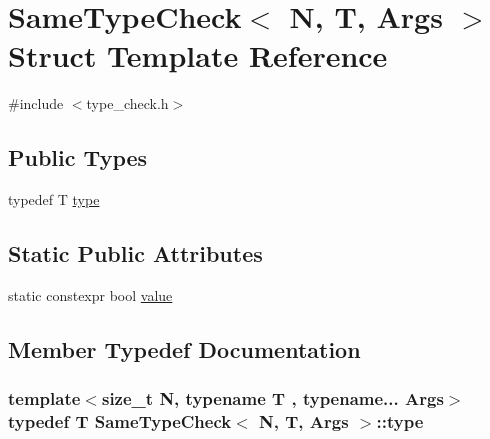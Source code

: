 \hypertarget{struct_same_type_check}{\section{Same\-Type\-Check$<$ N, T, Args $>$ Struct Template Reference}
\label{struct_same_type_check}
}


{\ttfamily \#include $<$type\-\_\-check.\-h$>$}

\subsection*{Public Types}
\begin{DoxyCompactItemize}
\item 
typedef T \hyperlink{struct_same_type_check_a2bd1b23b5f7e5f14acc5a64274651adb}{type}
\end{DoxyCompactItemize}
\subsection*{Static Public Attributes}
\begin{DoxyCompactItemize}
\item 
static constexpr bool \hyperlink{struct_same_type_check_a90fe116ef2512e49fc0065e1c9ccf302}{value}
\end{DoxyCompactItemize}


\subsection{Member Typedef Documentation}
\hypertarget{struct_same_type_check_a2bd1b23b5f7e5f14acc5a64274651adb}{
\subsubsection[{type}]{\setlength{\rightskip}{0pt plus 5cm}template$<$size\-\_\-t N, typename T , typename... Args$>$ typedef T {\bf Same\-Type\-Check}$<$ N, T, Args $>$\-::{\bf type}}}\label{struct_same_type_check_a2bd1b23b5f7e5f14acc5a64274651adb}


